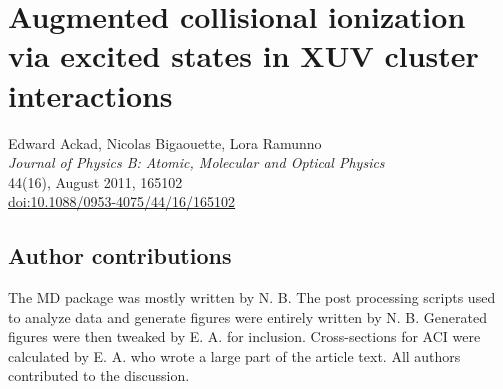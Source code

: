 
\newcommand{\PaperTitleACI}{Augmented collisional ionization via excited states in XUV cluster interactions}

\section{\PaperTitleACI}
\label{section:papers:aci}

\begin{flushright}
Edward Ackad, Nicolas Bigaouette, Lora Ramunno\\
\textit{Journal of Physics B: Atomic, Molecular and Optical Physics}\\
44(16), August 2011, 165102\\
\href{http://dx.doi.org/10.1088/0953-4075/44/16/165102}{doi:10.1088/0953-4075/44/16/165102}
\end{flushright}

\HidePDFAbstractNumber


\subsection{Author contributions}
The MD package was mostly written by N. B. The post processing scripts used to
analyze data and generate figures were entirely written by N. B. Generated
figures were then tweaked by E. A. for inclusion. Cross-sections for ACI were
calculated by E. A. who wrote a large part of the article text. All authors
contributed to the discussion.



